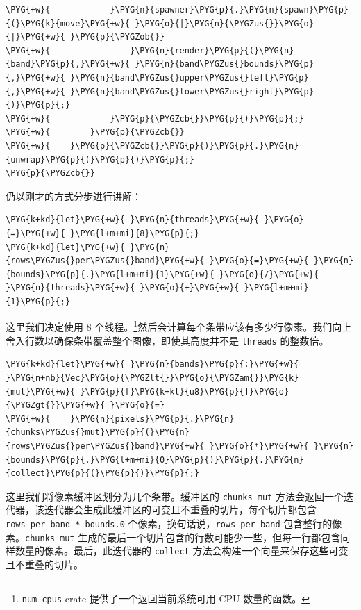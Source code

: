 \begin{Verbatim}[commandchars=\\\{\},breaklines=true,breakanywhere=true,fontsize=\codefont,xleftmargin=17bp]
\PYG{+w}{            }\PYG{n}{spawner}\PYG{p}{.}\PYG{n}{spawn}\PYG{p}{(}\PYG{k}{move}\PYG{+w}{ }\PYG{o}{|}\PYG{n}{\PYGZus{}}\PYG{o}{|}\PYG{+w}{ }\PYG{p}{\PYGZob{}}
\PYG{+w}{                }\PYG{n}{render}\PYG{p}{(}\PYG{n}{band}\PYG{p}{,}\PYG{+w}{ }\PYG{n}{band\PYGZus{}bounds}\PYG{p}{,}\PYG{+w}{ }\PYG{n}{band\PYGZus{}upper\PYGZus{}left}\PYG{p}{,}\PYG{+w}{ }\PYG{n}{band\PYGZus{}lower\PYGZus{}right}\PYG{p}{)}\PYG{p}{;}
\PYG{+w}{            }\PYG{p}{\PYGZcb{}}\PYG{p}{)}\PYG{p}{;}
\PYG{+w}{        }\PYG{p}{\PYGZcb{}}
\PYG{+w}{    }\PYG{p}{\PYGZcb{}}\PYG{p}{)}\PYG{p}{.}\PYG{n}{unwrap}\PYG{p}{(}\PYG{p}{)}\PYG{p}{;}
\PYG{p}{\PYGZcb{}}
\end{Verbatim}

仍以刚才的方式分步进行讲解：

\begin{Verbatim}[commandchars=\\\{\},breaklines=true,breakanywhere=true,fontsize=\codefont,xleftmargin=17bp]
\PYG{k+kd}{let}\PYG{+w}{ }\PYG{n}{threads}\PYG{+w}{ }\PYG{o}{=}\PYG{+w}{ }\PYG{l+m+mi}{8}\PYG{p}{;}
\PYG{k+kd}{let}\PYG{+w}{ }\PYG{n}{rows\PYGZus{}per\PYGZus{}band}\PYG{+w}{ }\PYG{o}{=}\PYG{+w}{ }\PYG{n}{bounds}\PYG{p}{.}\PYG{l+m+mi}{1}\PYG{+w}{ }\PYG{o}{/}\PYG{+w}{ }\PYG{n}{threads}\PYG{+w}{ }\PYG{o}{+}\PYG{+w}{ }\PYG{l+m+mi}{1}\PYG{p}{;}
\end{Verbatim}

这里我们决定使用 8 个线程。\footnote{\texttt{num\_cpus} crate 提供了一个返回当前系统可用 CPU 数量的函数。}然后会计算每个条带应该有多少行像素。我们向上舍入行数以确保条带覆盖整个图像，即使其高度并不是 \texttt{threads} 的整数倍。

\begin{Verbatim}[commandchars=\\\{\},breaklines=true,breakanywhere=true,fontsize=\codefont,xleftmargin=17bp]
\PYG{k+kd}{let}\PYG{+w}{ }\PYG{n}{bands}\PYG{p}{:}\PYG{+w}{ }\PYG{n+nb}{Vec}\PYG{o}{\PYGZlt{}}\PYG{o}{\PYGZam{}}\PYG{k}{mut}\PYG{+w}{ }\PYG{p}{[}\PYG{k+kt}{u8}\PYG{p}{]}\PYG{o}{\PYGZgt{}}\PYG{+w}{ }\PYG{o}{=}
\PYG{+w}{    }\PYG{n}{pixels}\PYG{p}{.}\PYG{n}{chunks\PYGZus{}mut}\PYG{p}{(}\PYG{n}{rows\PYGZus{}per\PYGZus{}band}\PYG{+w}{ }\PYG{o}{*}\PYG{+w}{ }\PYG{n}{bounds}\PYG{p}{.}\PYG{l+m+mi}{0}\PYG{p}{)}\PYG{p}{.}\PYG{n}{collect}\PYG{p}{(}\PYG{p}{)}\PYG{p}{;}
\end{Verbatim}

这里我们将像素缓冲区划分为几个条带。缓冲区的 \texttt{chunks\_mut} 方法会返回一个迭代器，该迭代器会生成此缓冲区的可变且不重叠的切片，每个切片都包含 \texttt{rows\_per\_band * bounds.0} 个像素，换句话说，\texttt{rows\_per\_band} 包含整行的像素。\texttt{chunks\_mut} 生成的最后一个切片包含的行数可能少一些，但每一行都包含同样数量的像素。最后，此迭代器的 \texttt{collect} 方法会构建一个向量来保存这些可变且不重叠的切片。

